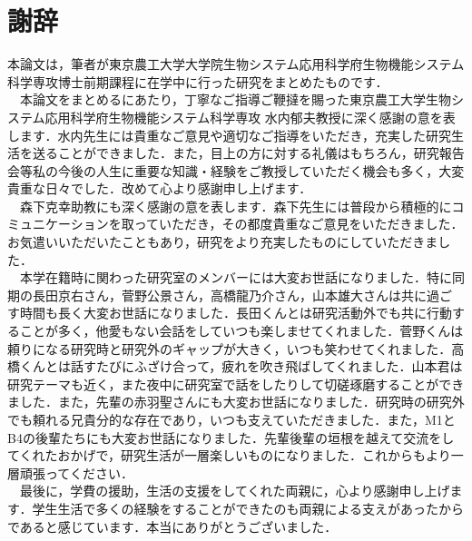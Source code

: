 \chapter*{謝辞}
本論文は，筆者が東京農工大学大学院生物システム応用科学府生物機能システム科学専攻博士前期課程に在学中に行った研究をまとめたものです．\\
　本論文をまとめるにあたり，丁寧なご指導ご鞭撻を賜った東京農工大学生物システム応用科学府生物機能システム科学専攻 水内郁夫教授に深く感謝の意を表します．水内先生には貴重なご意見や適切なご指導をいただき，充実した研究生活を送ることができました．また，目上の方に対する礼儀はもちろん，研究報告会等私の今後の人生に重要な知識・経験をご教授していただく機会も多く，大変貴重な日々でした．改めて心より感謝申し上げます．\\
　森下克幸助教にも深く感謝の意を表します．森下先生には普段から積極的にコミュニケーションを取っていただき，その都度貴重なご意見をいただきました．お気遣いいただいたこともあり，研究をより充実したものにしていただきました．\\
　本学在籍時に関わった研究室のメンバーには大変お世話になりました．特に同期の長田京右さん，菅野公景さん，高橋龍乃介さん，山本雄大さんは共に過ごす時間も長く大変お世話になりました．長田くんとは研究活動外でも共に行動することが多く，他愛もない会話をしていつも楽しませてくれました．菅野くんは頼りになる研究時と研究外のギャップが大きく，いつも笑わせてくれました．高橋くんとは話すたびにふざけ合って，疲れを吹き飛ばしてくれました．山本君は研究テーマも近く，また夜中に研究室で話をしたりして切磋琢磨することができました．また，先輩の赤羽聖さんにも大変お世話になりました．研究時の研究外でも頼れる兄貴分的な存在であり，いつも支えていただきました．また，M1とB4の後輩たちにも大変お世話になりました．先輩後輩の垣根を越えて交流をしてくれたおかげで，研究生活が一層楽しいものになりました．これからもより一層頑張ってください．\\
　最後に，学費の援助，生活の支援をしてくれた両親に，心より感謝申し上げます．学生生活で多くの経験をすることができたのも両親による支えがあったからであると感じています．本当にありがとうございました．
